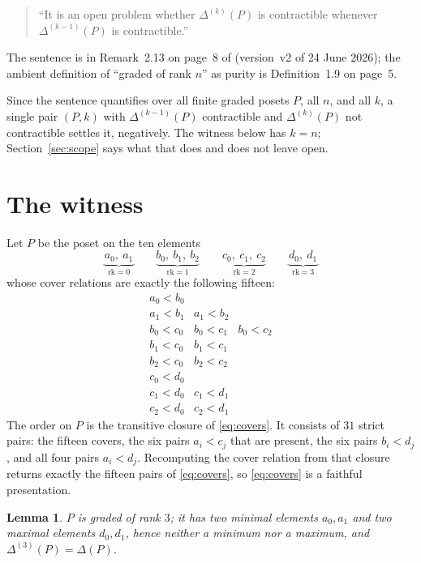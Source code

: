 \documentclass[11pt]{amsart}
\newtheorem{lemma}[theorem]{Lemma}
\newcommand{\rk}{\mathrm{rk}}
\newcommand{\Dl}{\Delta}
\begin{document}
\begin{quote}
``It is an open problem whether $\Dl^{(k)}(P)$ is contractible whenever
$\Dl^{(k-1)}(P)$ is contractible.''
\end{quote}

The sentence is in Remark~2.13 on page~8 of \cite{Kitajima} (version~v2 of
24 June 2026); the ambient definition of ``graded of rank $n$'' as purity is
Definition~1.9 on page~5.

Since the sentence quantifies over all finite graded posets $P$, all $n$, and
all $k$, a single pair $(P,k)$ with $\Dl^{(k-1)}(P)$ contractible and
$\Dl^{(k)}(P)$ not contractible settles it, negatively. The witness below has
$k=n$; Section~\ref{sec:scope} says what that does and does not leave open.

\section{The witness}\label{sec:witness}

Let $P$ be the poset on the ten elements
\[
  \underbrace{a_0,\ a_1}_{\rk=0}\qquad
  \underbrace{b_0,\ b_1,\ b_2}_{\rk=1}\qquad
  \underbrace{c_0,\ c_1,\ c_2}_{\rk=2}\qquad
  \underbrace{d_0,\ d_1}_{\rk=3}
\]
whose cover relations are exactly the following fifteen:
\begin{equation}\label{eq:covers}
\begin{array}{lll}
 a_0<b_0 & &\\
 a_1<b_1 & a_1<b_2 &\\
 b_0<c_0 & b_0<c_1 & b_0<c_2\\
 b_1<c_0 & b_1<c_1 &\\
 b_2<c_0 & b_2<c_2 &\\
 c_0<d_0 & &\\
 c_1<d_0 & c_1<d_1 &\\
 c_2<d_0 & c_2<d_1 &
\end{array}
\end{equation}
The order on $P$ is the transitive closure of \eqref{eq:covers}. It consists of
$31$ strict pairs: the fifteen covers, the six pairs $a_i<c_j$ that are
present, the six pairs $b_i<d_j$, and all four pairs $a_i<d_j$. Recomputing
the cover relation from that closure returns exactly the fifteen pairs of
\eqref{eq:covers}, so \eqref{eq:covers} is a faithful presentation.

\begin{lemma}\label{lem:graded}
$P$ is graded of rank $3$; it has two minimal elements $a_0,a_1$ and two
maximal elements $d_0,d_1$, hence neither a minimum nor a maximum, and
$\Dl^{(3)}(P)=\Dl(P)$.
\end{lemma}
\end{document}

